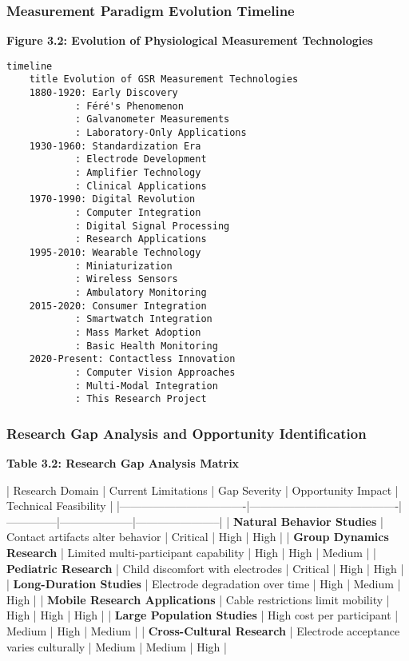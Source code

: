 \documentclass[11pt,a4paper]{report}
\begin{document}
\subsubsection{Measurement Paradigm Evolution Timeline}

\textbf{Figure 3.2: Evolution of Physiological Measurement Technologies}

\begin{verbatim}
timeline
    title Evolution of GSR Measurement Technologies
    1880-1920: Early Discovery
            : Féré's Phenomenon
            : Galvanometer Measurements
            : Laboratory-Only Applications
    1930-1960: Standardization Era
            : Electrode Development
            : Amplifier Technology
            : Clinical Applications
    1970-1990: Digital Revolution
            : Computer Integration
            : Digital Signal Processing
            : Research Applications
    1995-2010: Wearable Technology
            : Miniaturization
            : Wireless Sensors
            : Ambulatory Monitoring
    2015-2020: Consumer Integration
            : Smartwatch Integration
            : Mass Market Adoption
            : Basic Health Monitoring
    2020-Present: Contactless Innovation
            : Computer Vision Approaches
            : Multi-Modal Integration
            : This Research Project
\end{verbatim}

\subsubsection{Research Gap Analysis and Opportunity Identification}

\textbf{Table 3.2: Research Gap Analysis Matrix}

| Research Domain                  | Current Limitations                    | Gap Severity | Opportunity Impact | Technical Feasibility |
|----------------------------------|----------------------------------------|--------------|--------------------|-----------------------|
| \textbf{Natural Behavior Studies}     | Contact artifacts alter behavior       | Critical     | High               | High                  |
| \textbf{Group Dynamics Research}      | Limited multi-participant capability   | High         | High               | Medium                |
| \textbf{Pediatric Research}           | Child discomfort with electrodes       | Critical     | High               | High                  |
| \textbf{Long-Duration Studies}        | Electrode degradation over time        | High         | Medium             | High                  |
| \textbf{Mobile Research Applications} | Cable restrictions limit mobility      | High         | High               | High                  |
| \textbf{Large Population Studies}     | High cost per participant              | Medium       | High               | Medium                |
| \textbf{Cross-Cultural Research}      | Electrode acceptance varies culturally | Medium       | Medium             | High                  |
\end{document}
